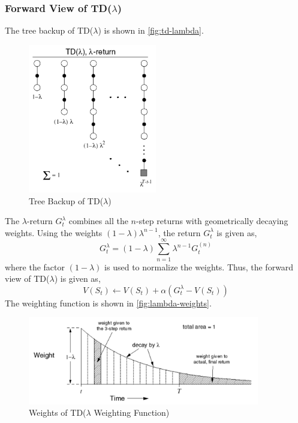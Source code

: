\subsubsection{Forward View of TD(\(\lambda \))}

The tree backup of TD(\(\lambda \)) is shown in \autoref{fig:td-lambda}.
\begin{figure}[H]
    \centering
    \includegraphics[width=0.5\textwidth]{figures/l-return.png}
    \caption{Tree Backup of TD(\(\lambda \))}
    \label{fig:td-lambda}
\end{figure}
The \(\lambda\)-return \(G_t^\lambda \) combines all the \(n\)-step returns with 
geometrically decaying weights. Using the weights \((1-\lambda)\lambda^{n-1}\), the return
\(G_t^\lambda \) is given as,
\[
    G_t^\lambda = (1-\lambda)\sum_{n=1}^{\infty}\lambda^{n-1}G_t^{(n)}
\]
where the factor \((1-\lambda)\) is used to normalize the weights. Thus, the forward view
of TD(\(\lambda \)) is given as,
\[
    V(S_t) \leftarrow V(S_t) + \alpha\left( 
        G_t^\lambda - V(S_t)
     \right)
\]
The weighting function is shown in \autoref{fig:lambda-weights}.
\begin{figure}[H]
    \centering
    \includegraphics[width=0.9\textwidth]{figures/l-weights.png}
    \caption{Weights of TD(\(\lambda \) Weighting Function)}
    \label{fig:lambda-weights}
\end{figure}



















